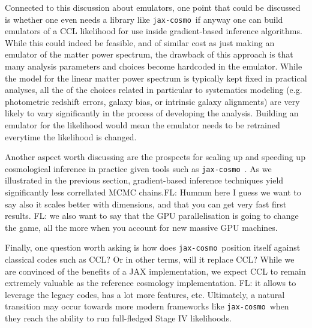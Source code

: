 \documentclass[twocolumn,twocolappendix,nofootinbib,iop]{openjournal}
\newcommand{\FrL}[1]{{\color{cyan}FL: #1}}
\newcommand{\jaxcosmo}{\texttt{jax-cosmo}}
\begin{document}
\bigskip

Connected to this discussion about emulators, one point that could be discussed is whether one even needs a library like \jaxcosmo\ if anyway one can build emulators of a CCL likelihood for use inside gradient-based inference algorithms. While this could indeed be feasible, and of similar cost as just making an emulator of the matter power spectrum, the drawback of this approach is that many analysis parameters and choices become hardcoded in the emulator. While the model for the linear matter power spectrum is typically kept fixed in practical analyses, all the of the choices related in particular to systematics modeling (e.g. photometric redshift errors, galaxy bias, or intrinsic galaxy alignments) are very likely to vary significantly in the process of developing the analysis. Building an emulator for the likelihood would mean the emulator needs to be retrained everytime the likelihood is changed.

\bigskip

Another aspect worth discussing are the prospects for scaling up and speeding up cosmological inference in practice given tools such as \jaxcosmo\ . As we illustrated in the previous section, gradient-based inference techniques yield significantly less correllated MCMC chains.\FrL{Hummm here I guess we want to say also it scales better with dimensions, and that you can get very fast first results.} \FrL{we also want to say that the GPU parallelisation is going to change the game, all the more when you account for new massive GPU machines.}


\bigskip

Finally, one question worth asking is how does \jaxcosmo\ position itself against classical codes such as CCL? Or in other terms, will it replace CCL? While we are convinced of the benefits of a JAX implementation, we expect CCL to remain extremely valuable as the reference cosmology implementation. \FrL{it allows to leverage the legacy codes, has a lot more features, etc.} Ultimately, a natural transition may occur towards more modern frameworks like \jaxcosmo\ when they reach the ability to run full-fledged Stage IV likelihoods.
\end{document}
